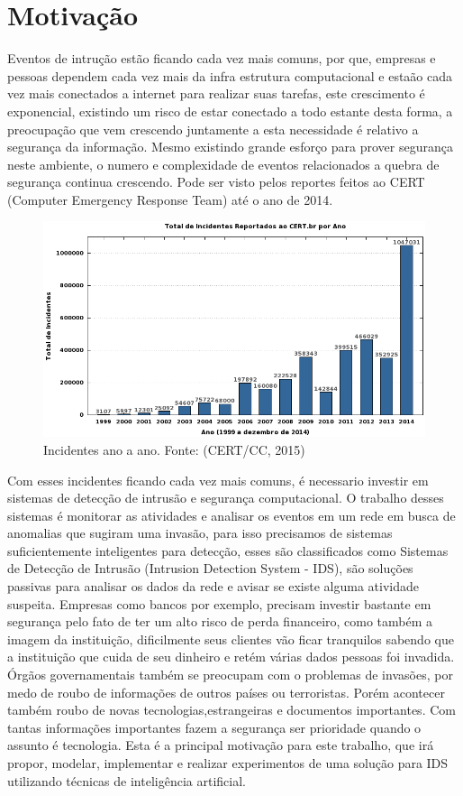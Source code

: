 \documentclass[
	12pt,				%
	openright,			%
	oneside,
	a4paper,			%
	english,			%
	french,				%
	spanish,			%
	brazil				%
	]{abntex2}
\begin{document}
\section{Motivação}

Eventos de intrução estão ficando cada vez mais comuns, por que,
empresas e pessoas dependem cada vez mais da infra estrutura computacional e estaão cada vez mais conectados a internet para realizar suas tarefas, este crescimento é exponencial, existindo um risco de estar conectado a todo estante desta forma, 
a preocupação que vem crescendo juntamente a esta necessidade é relativo a segurança da informação.
Mesmo existindo grande esforço para prover segurança neste ambiente, o numero e complexidade de eventos relacionados a quebra de segurança continua crescendo. Pode ser visto pelos reportes feitos ao CERT (Computer Emergency Response Team) até o ano de 2014.
\begin{figure}[!htb]
     \centering
     \includegraphics[scale=0.5]{Imagens/IntroGraf.png}
     \caption{Incidentes ano a ano. Fonte: (CERT/CC, 2015)}
\end{figure}

Com esses incidentes ficando cada vez mais comuns, é necessario investir em sistemas de detecção de intrusão e segurança computacional.
O trabalho desses sistemas é monitorar as atividades e analisar os eventos em um rede em busca de anomalias que sugiram uma invasão, para isso precisamos de sistemas suficientemente inteligentes para detecção, esses são classificados como Sistemas de Detecção de Intrusão (Intrusion Detection System
- IDS), são soluções passivas para analisar os dados da rede e avisar se existe alguma atividade suspeita.
Empresas como bancos por exemplo, precisam investir bastante em segurança pelo fato de ter um alto risco de perda financeiro, como também a imagem da instituição, dificilmente seus clientes vão ficar tranquilos sabendo que a instituição que cuida de seu dinheiro e retém várias dados pessoas foi invadida.
Órgãos governamentais também se preocupam com o problemas de invasões, por medo de roubo de informações de outros países ou terroristas.
Porém acontecer também roubo de novas tecnologias,estrangeiras e documentos importantes. Com tantas informações importantes fazem a segurança ser prioridade quando o assunto é tecnologia.
Esta é a principal motivação para este trabalho, que irá propor, modelar, implementar e realizar experimentos de uma solução para IDS utilizando técnicas de inteligência artificial.
\end{document}
